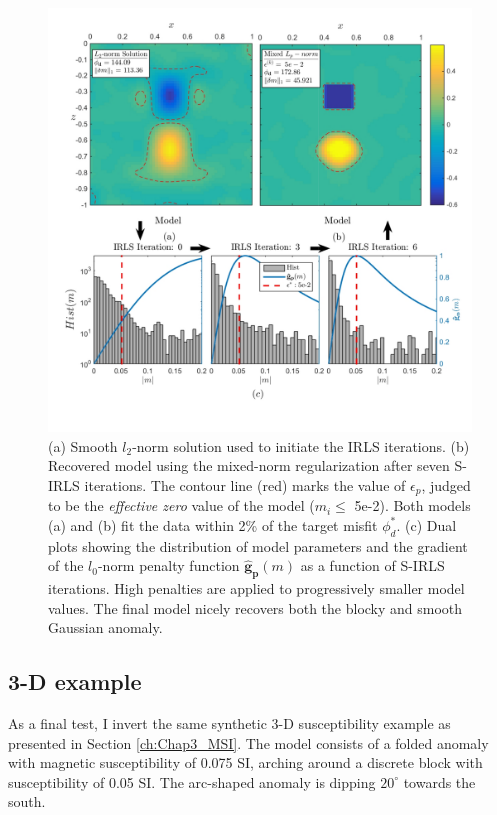\begin{figure}[p]
\centering
\includegraphics[scale=0.6]{2D_Mix_norm_result}
\caption{(a) Smooth $l_2$-norm solution used to initiate the IRLS iterations. (b) Recovered model using the mixed-norm regularization after seven S-IRLS iterations. The contour line (red) marks the value of $\epsilon_p$, judged to be the \emph{effective zero} value of the model ($m_i \leq $  5e-2). Both models (a) and (b) fit the data within 2\% of the target misfit $\phi_d^*$. (c) Dual plots showing the distribution of model parameters and the gradient of the $l_0$-norm penalty function $\mathbf{\hat g_p}(m)$ as a function of S-IRLS iterations. High penalties are applied to progressively smaller model values.
The final model nicely recovers both the blocky and smooth Gaussian anomaly.}
\label{fig:2D_Mix_norm_result}
\end{figure}


\newpage
\subsection{3-D example}
 As a final test, I invert the same synthetic 3-D susceptibility example as presented in Section \ref{ch:Chap3_MSI}. The model consists of a folded anomaly with magnetic susceptibility of 0.075 SI, arching around a discrete block with susceptibility of 0.05 SI. The arc-shaped anomaly is dipping $20^\circ$ towards the south. 
 
